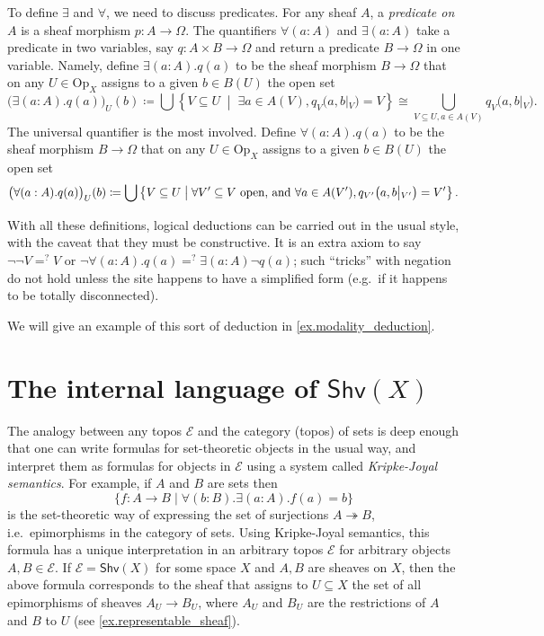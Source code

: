 \documentclass[11pt, oneside, article]{memoir}
\theoremstyle{plain}
\theoremstyle{definition}
\theoremstyle{remark}
\renewcommand{\ss}{\subseteq}
\newcommand{\Set}[1]{\mathrm{#1}}
\newcommand{\cat}[1]{\mathcal{#1}}
\newcommand{\Fun}[1]{\mathsf{#1}}
\newcommand{\surj}{\twoheadrightarrow}
\newcommand{\tn}[1]{\textnormal{#1}}
\newcommand{\shv}{\Fun{Shv}}
\newcommand{\Op}{\Set{Op}}
\newcommand{\rest}[2]{#1\big|\hspace{0in}_{#2}}
\begin{document}
To define $\exists$ and $\forall$, we need to discuss predicates. For any sheaf $A$, a \emph{predicate on $A$} is a sheaf morphism $p\colon A\to\Omega$. The quantifiers $\forall(a:A)$ and $\exists(a:A)$ take a predicate in two variables, say $q\colon A\times B\to\Omega$ and return a predicate $B\to\Omega$ in one variable. Namely, define $\exists(a:A).q(a)$ to be the sheaf morphism $B\to\Omega$ that on any $U\in\Op_X$ assigns to a given $b\in B(U)$ the open set
\[
\big(\exists(a:A).q(a)\big)_U(b)\coloneqq\bigcup\left\{V\ss U\;\middle|\;\exists a\in A(V), q_V\big(a,\rest{b}{V}\big)=V\right\}\cong\bigcup_{V\ss U,a\in A(V)}q_V\big(a,\rest{b}{V}\big).
\]
The universal quantifier is the most involved. Define $\forall(a:A).q(a)$ to be the sheaf morphism $B\to\Omega$ that on any $U\in\Op_X$ assigns to a given $b\in B(U)$ the open set
\[
\big(\forall(a:A).q(a)\big)_U(b)\coloneqq\bigcup\left\{V\ss U\;\middle|\;
\forall V'\ss V \tn{ open, and } \forall a\in A(V'), q_{V'}\big(a,\rest{b}{V'}\big)=V'\right\}.
\]

With all these definitions, logical deductions can be carried out in the usual style, with the caveat that they must be constructive. It is an extra axiom to say $\neg\neg V=^?V$ or $\neg\forall (a:A).q(a) =^? \exists (a:A)\neg q(a)$; such ``tricks'' with negation do not hold unless the site happens to have a simplified form (e.g.\ if it happens to be totally disconnected).

We will give an example of this sort of deduction in \cref{ex.modality_deduction}.

\section{The internal language of $\shv(X)$}\label{sec.internal_language}

The analogy between any topos $\cat{E}$ and the category (topos) of sets is deep enough that one can write formulas for set-theoretic objects in the usual way, and interpret them as formulas for objects in $\cat{E}$ using a system called \emph{Kripke-Joyal semantics}. For example, if $A$ and $B$ are sets then 
\begin{equation}\label{eqn.epi}
\{f\colon A\to B\mid \forall (b:B).\exists(a:A). f(a)=b\}
\end{equation}
is the set-theoretic way of expressing the set of surjections $A\surj B$, i.e.\ epimorphisms in the category of sets. Using Kripke-Joyal semantics, this formula has a unique interpretation in an arbitrary topos $\cat{E}$ for arbitrary objects $A,B\in\cat{E}$. If $\cat{E}=\shv(X)$ for some space $X$ and $A,B$ are sheaves on $X$, then the above formula corresponds to the sheaf that assigns to $U\ss X$ the set of all epimorphisms of sheaves $A_U\to B_U$, where $A_U$ and $B_U$ are the restrictions of $A$ and $B$ to $U$ (see \cref{ex.representable_sheaf}).
\end{document}
